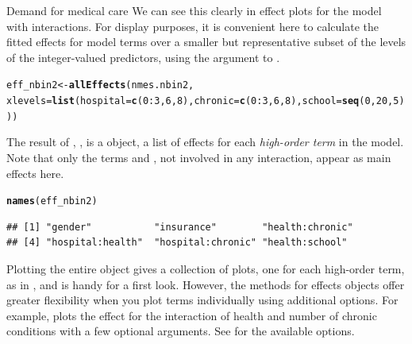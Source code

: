 \documentclass[11pt]{book}\usepackage[]{graphicx}\usepackage[]{color}
\makeatletter
\newcommand{\hlnum}[1]{\textcolor[rgb]{0.686,0.059,0.569}{#1}}%
\newcommand{\hlopt}[1]{\textcolor[rgb]{0,0,0}{#1}}%
\newcommand{\hlstd}[1]{\textcolor[rgb]{0.345,0.345,0.345}{#1}}%
\newcommand{\hlkwb}[1]{\textcolor[rgb]{0.69,0.353,0.396}{#1}}%
\newcommand{\hlkwc}[1]{\textcolor[rgb]{0.333,0.667,0.333}{#1}}%
\newcommand{\hlkwd}[1]{\textcolor[rgb]{0.737,0.353,0.396}{\textbf{#1}}}%
\newenvironment{kframe}{%
 \def\at@end@of@kframe{}%
 \ifinner\ifhmode%
  \def\at@end@of@kframe{\end{minipage}}%
  \begin{minipage}{\columnwidth}%
 \fi\fi%
 \def\FrameCommand##1{\hskip\@totalleftmargin \hskip-\fboxsep
 \colorbox{shadecolor}{##1}\hskip-\fboxsep
     \hskip-\linewidth \hskip-\@totalleftmargin \hskip\columnwidth}%
 \MakeFramed {\advance\hsize-\width
   \@totalleftmargin\z@ \linewidth\hsize
   \@setminipage}}%
 {\par\unskip\endMakeFramed%
 \at@end@of@kframe}
\newenvironment{knitrout}{}{} %
\renewenvironment{knitrout}{\small\renewcommand{\baselinestretch}{.85}}{} %
\makeatother
\begin{document}
\begin{Example}[nmes2a]{Demand for medical care}
We can see this clearly in effect plots for the model  with interactions.
For display purposes, 
it is convenient here to calculate the fitted effects for model terms
over a smaller but representative subset of the levels of the
integer-valued predictors, using the  argument to
.

\begin{knitrout}
\color{fgcolor}\begin{kframe}
\begin{alltt}
\hlstd{eff_nbin2} \hlkwb{<-} \hlkwd{allEffects}\hlstd{(nmes.nbin2,}
  \hlkwc{xlevels}\hlstd{=}\hlkwd{list}\hlstd{(}\hlkwc{hospital}\hlstd{=}\hlkwd{c}\hlstd{(}\hlnum{0}\hlopt{:}\hlnum{3}\hlstd{,} \hlnum{6}\hlstd{,} \hlnum{8}\hlstd{),} \hlkwc{chronic}\hlstd{=}\hlkwd{c}\hlstd{(}\hlnum{0}\hlopt{:}\hlnum{3}\hlstd{,} \hlnum{6}\hlstd{,} \hlnum{8}\hlstd{),} \hlkwc{school}\hlstd{=}\hlkwd{seq}\hlstd{(}\hlnum{0}\hlstd{,}\hlnum{20}\hlstd{,}\hlnum{5}\hlstd{)))}
\end{alltt}
\end{kframe}
\end{knitrout}
The result of , , is a  object, a list of effects for each
\emph{high-order term} in the model.  Note that only the terms  and ,
not involved in any interaction, appear as main effects here.
\begin{knitrout}
\color{fgcolor}\begin{kframe}
\begin{alltt}
\hlkwd{names}\hlstd{(eff_nbin2)}
\end{alltt}
\begin{verbatim}
## [1] "gender"           "insurance"        "health:chronic"  
## [4] "hospital:health"  "hospital:chronic" "health:school"
\end{verbatim}
\end{kframe}
\end{knitrout}
Plotting the entire  object gives a collection of plots, one for each high-order term, as in
, and is handy for a first look. However, the  methods for effects
objects offer greater flexibility when you plot terms individually using additional options. 
For example,  plots the effect for the interaction of health and number of chronic conditions
with a few optional arguments. See  for the available options.


\end{Example}
\end{document}
